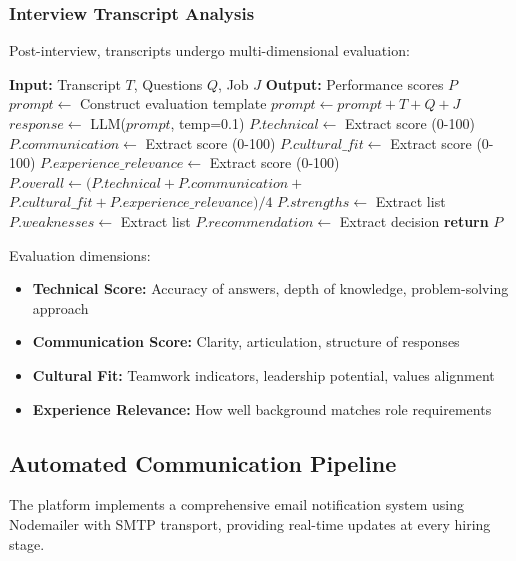 \documentclass[conference]{IEEEtran}
\begin{document}
\subsubsection{Interview Transcript Analysis}

Post-interview, transcripts undergo multi-dimensional evaluation:

\begin{algorithm}[h]
\caption{Interview Performance Analysis}
\label{alg:interview_analysis}
\begin{algorithmic}[1]
\STATE \textbf{Input:} Transcript $T$, Questions $Q$, Job $J$
\STATE \textbf{Output:} Performance scores $P$
\STATE
\STATE $prompt \leftarrow$ Construct evaluation template
\STATE $prompt \leftarrow prompt + T + Q + J$
\STATE $response \leftarrow$ LLM($prompt$, temp=0.1)
\STATE $P.technical \leftarrow$ Extract score (0-100)
\STATE $P.communication \leftarrow$ Extract score (0-100)
\STATE $P.cultural\_fit \leftarrow$ Extract score (0-100)
\STATE $P.experience\_relevance \leftarrow$ Extract score (0-100)
\STATE $P.overall \leftarrow (P.technical + P.communication +$
\STATE \quad\quad\quad\quad\quad $P.cultural\_fit + P.experience\_relevance) / 4$
\STATE $P.strengths \leftarrow$ Extract list
\STATE $P.weaknesses \leftarrow$ Extract list
\STATE $P.recommendation \leftarrow$ Extract decision
\STATE \textbf{return} $P$
\end{algorithmic}
\end{algorithm}

Evaluation dimensions:
\begin{itemize}
    \item \textbf{Technical Score:} Accuracy of answers, depth of knowledge, problem-solving approach
    \item \textbf{Communication Score:} Clarity, articulation, structure of responses
    \item \textbf{Cultural Fit:} Teamwork indicators, leadership potential, values alignment
    \item \textbf{Experience Relevance:} How well background matches role requirements
\end{itemize}

\subsection{Automated Communication Pipeline}

The platform implements a comprehensive email notification system using Nodemailer with SMTP transport, providing real-time updates at every hiring stage.
\end{document}
